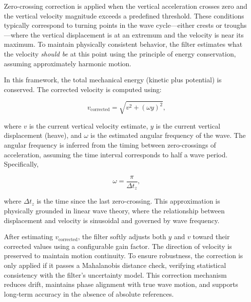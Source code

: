 \documentclass[11pt,letterpaper]{article}
\begin{document}
Zero-crossing correction is applied when the vertical acceleration crosses zero and the vertical velocity magnitude exceeds a predefined threshold. These conditions typically correspond to turning points in the wave cycle—either crests or troughs—where the vertical displacement is at an extremum and the velocity is near its maximum. To maintain physically consistent behavior, the filter estimates what the velocity \emph{should be} at this point using the principle of energy conservation, assuming approximately harmonic motion.

In this framework, the total mechanical energy (kinetic plus potential) is conserved. The corrected velocity is computed using:

\begin{equation}
v_{\text{corrected}} = \sqrt{v^2 + (\omega y)^2},
\end{equation}

where \( v \) is the current vertical velocity estimate, \( y \) is the current vertical displacement (heave), and \( \omega \) is the estimated angular frequency of the wave. The angular frequency is inferred from the timing between zero-crossings of acceleration, assuming the time interval corresponds to half a wave period. Specifically,

\begin{equation}
\omega = \frac{\pi}{\Delta t_{z}},
\end{equation}

where \( \Delta t_{z} \) is the time since the last zero-crossing. This approximation is physically grounded in linear wave theory, where the relationship between displacement and velocity is sinusoidal and governed by wave frequency.

After estimating \( v_{\text{corrected}} \), the filter softly adjusts both \( y \) and \( v \) toward their corrected values using a configurable gain factor. The direction of velocity is preserved to maintain motion continuity. To ensure robustness, the correction is only applied if it passes a Mahalanobis distance check, verifying statistical consistency with the filter's uncertainty model. This correction mechanism reduces drift, maintains phase alignment with true wave motion, and supports long-term accuracy in the absence of absolute references.
\end{document}
